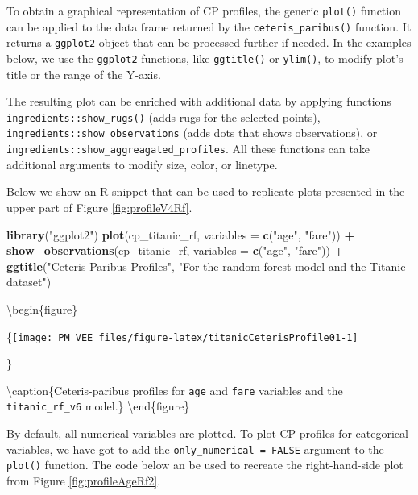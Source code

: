 \documentclass[12pt,]{krantz}
\newenvironment{Shaded}{\begin{snugshade}}{\end{snugshade}}
\newcommand{\DataTypeTok}[1]{\textcolor[rgb]{0.13,0.29,0.53}{#1}}
\newcommand{\KeywordTok}[1]{\textcolor[rgb]{0.13,0.29,0.53}{\textbf{#1}}}
\newcommand{\NormalTok}[1]{#1}
\newcommand{\OperatorTok}[1]{\textcolor[rgb]{0.81,0.36,0.00}{\textbf{#1}}}
\newcommand{\StringTok}[1]{\textcolor[rgb]{0.31,0.60,0.02}{#1}}
\theoremstyle{definition}
\theoremstyle{definition}
\theoremstyle{definition}
\theoremstyle{remark}
\begin{document}
To obtain a graphical representation of CP profiles, the generic
\texttt{plot()} function can be applied to the data frame returned by
the \texttt{ceteris\_paribus()} function. It returns a \texttt{ggplot2}
object that can be processed further if needed. In the examples below,
we use the \texttt{ggplot2} functions, like \texttt{ggtitle()} or
\texttt{ylim()}, to modify plot's title or the range of the Y-axis.

The resulting plot can be enriched with additional data by applying
functions \texttt{ingredients::show\_rugs()} (adds rugs for the selected
points), \texttt{ingredients::show\_observations} (adds dots that shows
observations), or \texttt{ingredients::show\_aggreagated\_profiles}. All
these functions can take additional arguments to modify size, color, or
linetype.

Below we show an R snippet that can be used to replicate plots presented
in the upper part of Figure \ref{fig:profileV4Rf}.

\begin{Shaded}
\begin{Highlighting}[]
\KeywordTok{library}\NormalTok{(}\StringTok{"ggplot2"}\NormalTok{)}
\KeywordTok{plot}\NormalTok{(cp_titanic_rf, }\DataTypeTok{variables =} \KeywordTok{c}\NormalTok{(}\StringTok{"age"}\NormalTok{, }\StringTok{"fare"}\NormalTok{)) }\OperatorTok{+}
\StringTok{  }\KeywordTok{show_observations}\NormalTok{(cp_titanic_rf, }\DataTypeTok{variables =} \KeywordTok{c}\NormalTok{(}\StringTok{"age"}\NormalTok{, }\StringTok{"fare"}\NormalTok{)) }\OperatorTok{+}
\StringTok{  }\KeywordTok{ggtitle}\NormalTok{(}\StringTok{"Ceteris Paribus Profiles"}\NormalTok{, }\StringTok{"For the random forest model and the Titanic dataset"}\NormalTok{)}
\end{Highlighting}
\end{Shaded}

\textbackslash{}begin\{figure\}

\{\centering \texttt{[image: PM\_VEE\_files/figure-latex/titanicCeterisProfile01-1]}

\}

\textbackslash{}caption\{Ceteris-paribus profiles for \texttt{age} and
\texttt{fare} variables and the \texttt{titanic\_rf\_v6}
model.\}\label{fig:titanicCeterisProfile01} \textbackslash{}end\{figure\}

By default, all numerical variables are plotted. To plot CP profiles for
categorical variables, we have got to add the
\texttt{only\_numerical\ =\ FALSE} argument to the \texttt{plot()}
function. The code below an be used to recreate the right-hand-side plot
from Figure \ref{fig:profileAgeRf2}.
\end{document}
